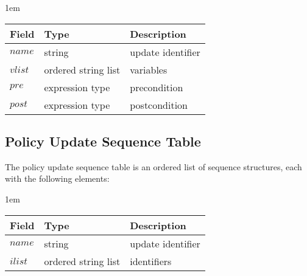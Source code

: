 \documentclass[11pt, twocolumn]{article}
\newenvironment{vquote}
  {\begin{list}{}{\leftmargin 1em}\item[]}
  {\end{list}}
\begin{document}
        \begin{vquote}
          \begin{tabular}[t]{|l|l|l|}
            \hline
            \textbf{Field} & \textbf{Type} & \textbf{Description} \\
            \hline
            $name$ & string & update identifier \\
            \hline
            $vlist$ & ordered string list & variables \\
            \hline
            $pre$ & expression type & precondition \\
            \hline
            $post$ & expression type & postcondition \\
            \hline
          \end{tabular}
        \end{vquote}

    \subsection{Policy Update Sequence Table}

      The policy update sequence table is an ordered list of sequence
      structures, each with the following elements:

      \begin{vquote}
        \begin{tabular}[t]{|l|l|l|}
          \hline
          \textbf{Field} & \textbf{Type} & \textbf{Description} \\
          \hline
          $name$ & string & update identifier \\
          \hline
          $ilist$ & ordered string list & identifiers \\
          \hline
        \end{tabular}
      \end{vquote}
\end{document}

